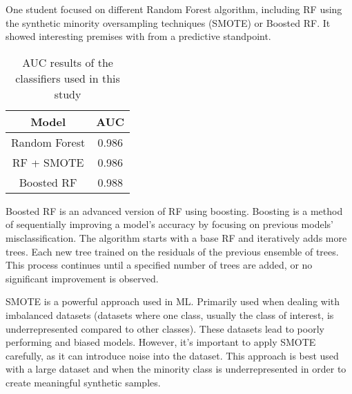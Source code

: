 One student focused on different Random Forest algorithm, including RF using the synthetic minority oversampling techniques (SMOTE) or Boosted RF. It showed interesting premises with from a predictive standpoint. \cite{lee_machine_2019}
\begin{table}[H]
    \centering
    \caption{AUC results of the classifiers used in this study\cite{lee_machine_2019}}
    \begin{tabular}{|c|c|}
        \hline
        \textbf{Model} & \textbf{AUC}\\
        \hline
        Random Forest & 0.986 \\
        \hline
        RF + SMOTE & 0.986\\
        \hline
        Boosted RF & 0.988 \\
        \hline
    \end{tabular}
    \label{tab:auc_values_lee}
\end{table}

Boosted RF is an advanced version of RF using boosting. Boosting is a method of sequentially improving a model's accuracy by focusing on previous models' misclassification. The algorithm starts with a base RF and iteratively adds more trees. Each new tree trained on the residuals of the previous ensemble of trees. This process continues until a specified number of trees are added, or no significant improvement is observed.

SMOTE is a powerful approach used in ML. Primarily used when dealing with imbalanced datasets (datasets where one class, usually the class of interest, is underrepresented compared to other classes). These datasets lead to poorly performing and biased models.
However, it's important to apply SMOTE carefully, as it can introduce noise into the dataset. This approach is best used with a large dataset and when the minority class is underrepresented in order to create meaningful synthetic samples.